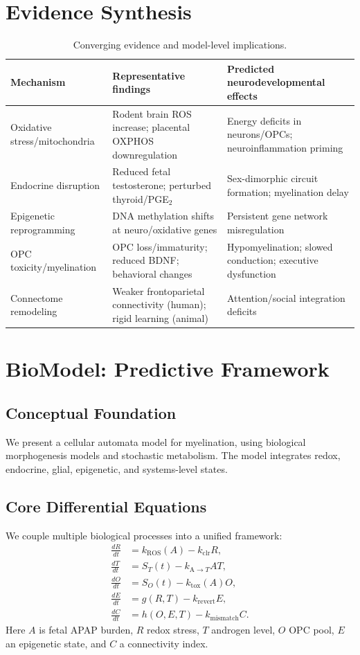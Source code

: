 \documentclass[12pt]{article}
\begin{document}
\section{Evidence Synthesis}
\begin{table}[h]
  \centering
  \small
  \begin{tabular}{@{}p{3.2cm} p{6.6cm} p{5.2cm}@{}}
  \toprule
  Mechanism & Representative findings & Predicted neurodevelopmental effects \\
  \midrule
  Oxidative stress/mitochondria & Rodent brain ROS increase; placental OXPHOS downregulation & Energy deficits in neurons/OPCs; neuroinflammation priming \\
  Endocrine disruption & Reduced fetal testosterone; perturbed thyroid/PGE$_2$ & Sex-dimorphic circuit formation; myelination delay \\
  Epigenetic reprogramming & DNA methylation shifts at neuro/oxidative genes & Persistent gene network misregulation \\
  OPC toxicity/myelination & OPC loss/immaturity; reduced BDNF; behavioral changes & Hypomyelination; slowed conduction; executive dysfunction \\
  Connectome remodeling & Weaker frontoparietal connectivity (human); rigid learning (animal) & Attention/social integration deficits \\
  \bottomrule
  \end{tabular}
  \caption{Converging evidence and model-level implications.}
\end{table}

\section{BioModel: Predictive Framework}

\subsection{Conceptual Foundation}
We present a cellular automata model for myelination, using biological morphogenesis models and stochastic metabolism. The model integrates redox, endocrine, glial, epigenetic, and systems-level states.

\subsection{Core Differential Equations}
We couple multiple biological processes into a unified framework:
\begin{align}
\frac{dR}{dt} &= k_{\mathrm{ROS}}(A) - k_{\mathrm{clr}} R, \\
\frac{dT}{dt} &= S_{T}(t) - k_{\mathrm{A}\to T} A T, \\
\frac{dO}{dt} &= S_{O}(t) - k_{\mathrm{tox}}(A) O, \\
\frac{dE}{dt} &= g(R,T) - k_{\mathrm{revert}} E, \\
\frac{dC}{dt} &= h(O,E,T) - k_{\mathrm{mismatch}} C.
\end{align}
Here $A$ is fetal APAP burden, $R$ redox stress, $T$ androgen level,
$O$ OPC pool, $E$ an epigenetic state, and $C$ a connectivity index.
\end{document}
